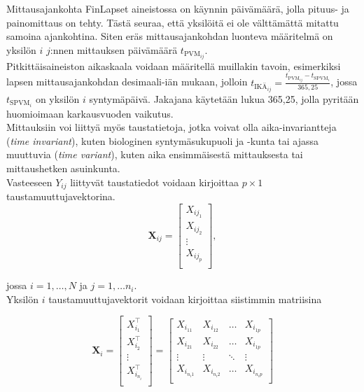 \documentclass[finnish]{docopts}
\begin{document}
Mittausajankohta FinLapset aineistossa on käynnin päivämäärä, jolla pituus- ja painomittaus on tehty. Tästä seuraa, että yksilöitä ei ole välttämättä mitattu samoina ajankohtina. Siten eräs mittausajankohdan luonteva määritelmä on yksilön $i$ $j$:nnen mittauksen päivämäärä $t_{\text{PVM}_{ij}}$.\\

Pitkittäisaineiston aikaskaala voidaan määritellä muillakin tavoin, esimerkiksi lapsen mittausajankohdan desimaali-iän mukaan, jolloin $t_{\text{IKÄ}_{ij}} = \frac{t_{\text{PVM}_{ij}} - t_{\text{SPVM}_{i}}}{365,25}$, jossa $t_{\text{SPVM}_{i}}$ on yksilön $i$ syntymäpäivä. Jakajana käytetään lukua 365,25, jolla pyritään huomioimaan karkausvuoden vaikutus.\\ 

Mittauksiin voi liittyä myös taustatietoja, jotka voivat olla aika-invariantteja (\textit{time invariant}), kuten biologinen syntymäsukupuoli ja -kunta tai ajassa muuttuvia (\textit{time variant}), kuten aika ensimmäisestä mittauksesta tai mittaushetken asuinkunta.\\

Vasteeseen $Y_{ij}$ liittyvät taustatiedot voidaan kirjoittaa $p \times 1$ taustamuuttujavektorina. \\

$$
\bm{X}_{ij} = 
\begin{bmatrix}
X_{ij_{1}} \\
X_{ij_{2}} \\
\vdots \\
X_{ij_{p}} \\
\end{bmatrix},
$$

jossa $i = 1, \dots, N$ ja $j = 1, \dots n_i$. \\ 

Yksilön $i$ taustamuuttujavektorit voidaan kirjoittaa siistimmin matriisina

$$
\bm{X}_{i} = 
\begin{bmatrix}
X_{i_{1}}^\top \\
X_{i_{2}}^\top  \\
\vdots \\
X_{i_{n_i}}^\top  \\
\end{bmatrix}
=
\begin{bmatrix}
X_{i_{11}} & X_{i_{12}} & \dots & X_{i_{1p}} \\
X_{i_{21}} & X_{i_{22}} & \dots & X_{i_{1p}} \\
\vdots & \vdots & \ddots & \vdots \\
X_{i_{n_i1}} & X_{i_{n_i2}} & \dots & X_{i_{n_ip}} \\
\end{bmatrix}
$$\\
\end{document}

